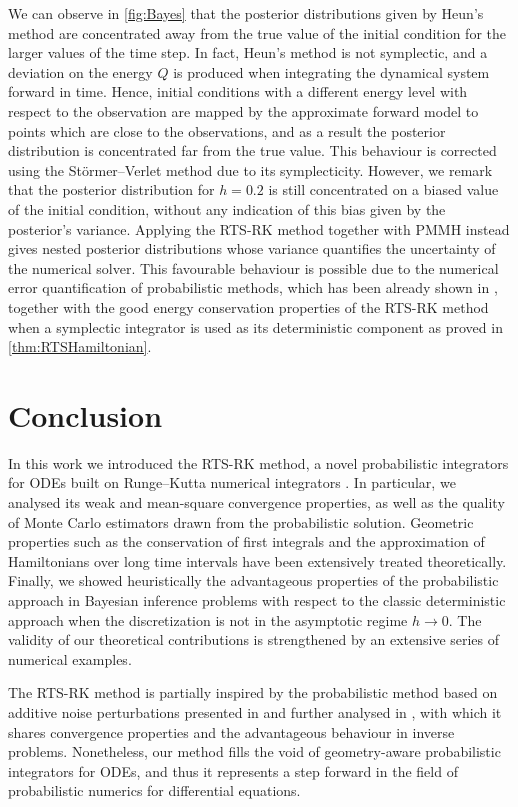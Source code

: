 \documentclass[10pt]{article}
\begin{document}
We can observe in \cref{fig:Bayes} that the posterior distributions given by Heun's method are concentrated away from the true value of the initial condition for the larger values of the time step. In fact, Heun's method is not symplectic, and a deviation on the energy $Q$ is produced when integrating the dynamical system forward in time. Hence, initial conditions with a different energy level with respect to the observation are mapped by the approximate forward model to points which are close to the observations, and as a result the posterior distribution is concentrated far from the true value. This behaviour is corrected using the Störmer--Verlet method due to its symplecticity. However, we remark that the posterior distribution for $h = 0.2$ is still concentrated on a biased value of the initial condition, without any indication of this bias given by the posterior's variance. Applying the RTS-RK method together with PMMH instead gives nested posterior distributions whose variance quantifies the uncertainty of the numerical solver. This favourable behaviour is possible due to the numerical error quantification of probabilistic methods, which has been already shown in \cite{CGS17, COS17}, together with the good energy conservation properties of the RTS-RK method when a symplectic integrator is used as its deterministic component as proved in \cref{thm:RTSHamiltonian}.

\section{Conclusion}

In this work we introduced the RTS-RK method, a novel probabilistic integrators for ODEs built on Runge--Kutta numerical integrators . In particular, we analysed its weak and mean-square convergence properties, as well as the quality of Monte Carlo estimators drawn from the probabilistic solution. Geometric properties such as the conservation of first integrals and the approximation of Hamiltonians over long time intervals have been extensively treated theoretically. Finally, we showed heuristically the advantageous properties of the probabilistic approach in Bayesian inference problems with respect to the classic deterministic approach when the discretization is not in the asymptotic regime $h \to 0$. The validity of our theoretical contributions is strengthened by an extensive series of numerical examples.

The RTS-RK method is partially inspired by the probabilistic method based on additive noise perturbations presented in \cite{CGS17} and further analysed in \cite{LSS19b}, with which it shares convergence properties and the advantageous behaviour in inverse problems. Nonetheless, our method fills the void of geometry-aware probabilistic integrators for ODEs, and thus it represents a step forward in the field of probabilistic numerics for differential equations.
\end{document}
